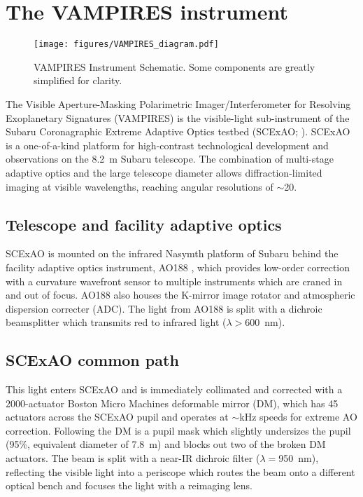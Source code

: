 \section{The VAMPIRES instrument}\label{sec:design}

\begin{figure*}[t]
    \centering
    \texttt{[image: figures/VAMPIRES\_diagram.pdf]}
    \caption{VAMPIRES Instrument Schematic. Some components are greatly simplified for clarity.}
    \label{fig:schematic}
\end{figure*}

The Visible Aperture-Masking Polarimetric Imager/Interferometer for Resolving Exoplanetary Signatures (VAMPIRES) is the visible-light sub-instrument of the Subaru Coronagraphic Extreme Adaptive Optics testbed (SCExAO; \citet{jovanovic_subaru_2015}). SCExAO is a one-of-a-kind platform for high-contrast technological development and observations on the \SI{8.2}{\meter} Subaru telescope. The combination of multi-stage adaptive optics and the large telescope diameter allows diffraction-limited imaging at visible wavelengths, reaching angular resolutions of $\sim$\SI{20}{\mas}. 


\subsection{Telescope and facility adaptive optics}
SCExAO is mounted on the infrared Nasymth platform of Subaru behind the facility adaptive optics instrument, AO188 \citep{minowa_performance_2010}, which provides low-order correction with a curvature wavefront sensor to multiple instruments which are craned in and out of focus. AO188 also houses the K-mirror image rotator and atmospheric dispersion correcter (ADC). The light from AO188 is split with a dichroic beamsplitter which transmits red to infrared light ($\lambda >$\SI{600}{\nano\meter}). 

\subsection{SCExAO common path}
This light enters SCExAO and is immediately collimated and corrected with a 2000-actuator Boston Micro Machines deformable mirror (DM), which has 45 actuators across the SCExAO pupil and operates at $\sim$\si{\kilo\hertz} speeds for extreme AO correction. Following the DM is a pupil mask which slightly undersizes the pupil (95\%, equivalent diameter of \SI{7.8}{\meter}) and blocks out two of the broken DM actuators. The beam is split with a near-IR dichroic filter ($\lambda=$\SI{950}{\nano\meter}), reflecting the visible light into a periscope which routes the beam onto a different optical bench and focuses the light with a reimaging lens.

